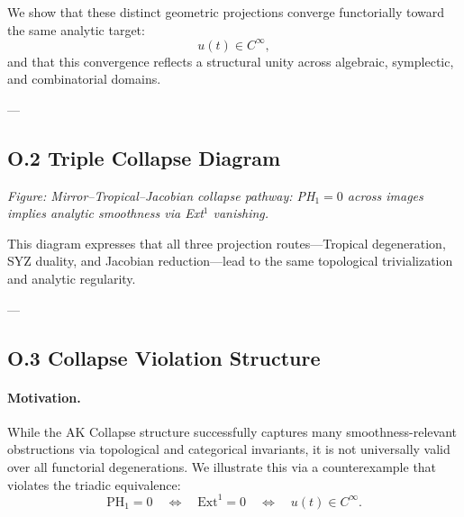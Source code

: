 \documentclass[11pt]{article}
\begin{document}
\begin{axiom}
\begin{axiom}
{{We show that these distinct geometric projections converge functorially toward the same analytic target:
\[
u(t) \in C^\infty,
\]
and that this convergence reflects a structural unity across algebraic, symplectic, and combinatorial domains.

---

\subsection*{O.2 Triple Collapse Diagram}

\noindent
\begin{minipage}{\textwidth}
\centering
{}
\vspace{0.5em}

\small\textit{Figure: Mirror–Tropical–Jacobian collapse pathway: PH$_1 = 0$ across images implies analytic smoothness via Ext$^1$ vanishing.}
\end{minipage}

This diagram expresses that all three projection routes—Tropical degeneration, SYZ duality, and Jacobian reduction—lead to the same topological trivialization and analytic regularity.

---

\subsection*{O.3 Collapse Violation Structure}

\paragraph{Motivation.}
While the AK Collapse structure successfully captures many smoothness-relevant obstructions via topological and categorical invariants, it is not universally valid over all functorial degenerations. We illustrate this via a counterexample that violates the triadic equivalence:  
\[
\mathrm{PH}_1 = 0 \quad \Leftrightarrow \quad \mathrm{Ext}^1 = 0 \quad \Leftrightarrow \quad u(t) \in C^\infty.
\]

}}
\end{axiom}
\end{axiom}
\end{document}
